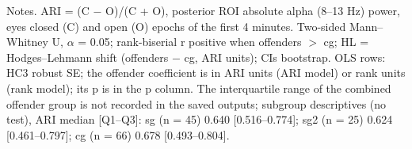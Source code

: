 \begin{table}[htbp]
\centering
\caption{[CAPTION]}
\label{tab:Table3}
\footnotesize
{}
\par\smallskip
\begin{minipage}{\textwidth}\raggedright\scriptsize
Notes. ARI = (C $-$ O)/(C + O), posterior ROI absolute alpha (8--13 Hz) power, eyes closed (C) and open (O) epochs of the first 4 minutes. Two-sided Mann--Whitney U, $\alpha$ = 0.05; rank-biserial r positive when offenders $>$ cg; HL = Hodges--Lehmann shift (offenders $-$ cg, ARI units); CIs bootstrap. OLS rows: HC3 robust SE; the offender coefficient is in ARI units (ARI model) or rank units (rank model); its p is in the p column. The interquartile range of the combined offender group is not recorded in the saved outputs; subgroup descriptives (no test), ARI median [Q1--Q3]: sg (n = 45) 0.640 [0.516--0.774]; sg2 (n = 25) 0.624 [0.461--0.797]; cg (n = 66) 0.678 [0.493--0.804].
\end{minipage}
\end{table}
